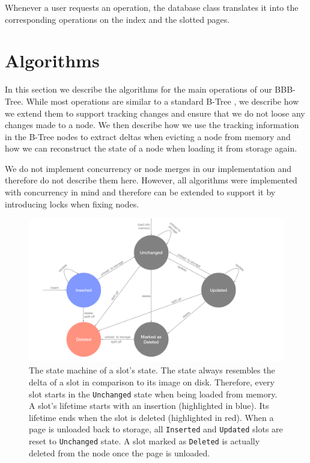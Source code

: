 Whenever a user requests an operation, the database class translates it into the corresponding operations on the index and the slotted pages.

\section{Algorithms}
\label{sec:algorithms}
In this section we describe the algorithms for the main operations of our BBB-Tree.
While most operations are similar to a standard B-Tree \cite{mdbs2024slides}, we describe how we extend them to support tracking changes and ensure that we do not loose any changes made to a node.
We then describe how we use the tracking information in the B-Tree nodes to extract deltas when evicting a node from memory and how we can reconstruct the state of a node when loading it from storage again.

We do not implement concurrency or node merges in our implementation and therefore do not describe them here.
However, all algorithms were implemented with concurrency in mind and therefore can be extended to support it by introducing locks when fixing nodes.

\begin{figure}[htbp]
  \centering
  \includegraphics[width=1\textwidth]{figures/slot_states.pdf}
  \caption{The state machine of a slot's state. The state always resembles the delta of a slot in comparison to its image on disk. Therefore, every slot starts in the \texttt{Unchanged} state when being loaded from memory. A slot's lifetime starts with an insertion (highlighted in blue). Its lifetime ends when the slot is deleted (highlighted in red). When a page is unloaded back to storage, all \texttt{Inserted} and \texttt{Updated} slots are reset to \texttt{Unchanged} state. A slot marked as \texttt{Deleted} is actually deleted from the node once the page is unloaded.}
  \label{fig:slot-states}
\end{figure}

